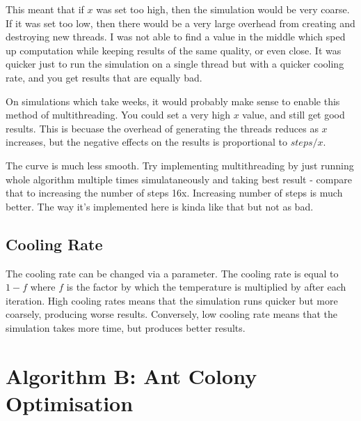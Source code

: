 \documentclass[a4paper, 11pt,table]{article}
\begin{document}
This meant that if $x$ was set too high, then the simulation would be very coarse. If it was set too low, then there would be a very large overhead from creating and destroying new threads. I was not able to find a value in the middle which sped up computation while keeping results of the same quality, or even close. It was quicker just to run the simulation on a single thread but with a quicker cooling rate, and you get results that are equally bad.

On simulations which take weeks, it would probably make sense to enable this method of multithreading. You could set a very high $x$ value, and still get good results. This is becuase the overhead of generating the threads reduces as $x$ increases, but the negative effects on the results is proportional to $steps/x$.

The curve is much less smooth. Try implementing multithreading by just running whole algorithm multiple times simulataneously and taking best result - compare that to increasing the number of steps 16x. Increasing number of steps is much better. The way it's implemented here is kinda like that but not as bad.

\subsection{Cooling Rate}
The cooling rate can be changed via a parameter. The cooling rate is equal to $1-f$ where $f$ is the factor by which the temperature is multiplied by after each iteration. High cooling rates means that the simulation runs quicker but more coarsely, producing worse results. Conversely, low cooling rate means that the simulation takes more time, but produces better results.
	
	\section{Algorithm B: Ant Colony Optimisation}
	
\end{document}
